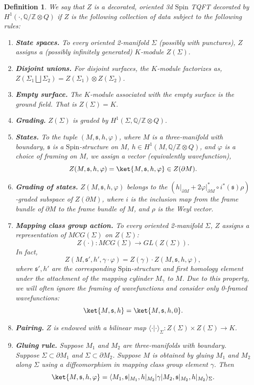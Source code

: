 \documentclass{article}
\newcommand{\Z}{{\mathbb Z}}
\newcommand{\Q}{{\mathbb Q}}
\newtheorem{definition}{Definition}
\numberwithin{corollary}{theorem}
\numberwithin{corollary}{proposition}
\begin{document}
\begin{definition} We say that $Z$ is a decorated, oriented 3d $\mathrm{Spin}$ TQFT decorated by $H^{1}(\cdot,\Q/\Z\otimes Q)$ if $Z$ is the following collection of data subject to the following rules: 
\begin{enumerate}
    \item \textbf{State spaces.} To every oriented 2-manifold $\Sigma$ (possibly with punctures), $Z$ assigns a (possibly infinitely generated) $K$-module $Z(\Sigma)$.
    \item \textbf{Disjoint unions.} For disjoint surfaces, the $K$-module factorizes as, $Z(\Sigma_1 \bigsqcup \Sigma_2) = Z(\Sigma_1) \otimes Z(\Sigma_2)$.
    \item \textbf{Empty surface.} The $K$-module associated with the empty surface is the ground field. That is $Z(\Sigma) = K$.
    \item \textbf{Grading.} $Z(\Sigma)$ is graded by $H^{1}(\Sigma, \Q/\Z\otimes Q)$.
    \item \textbf{States.} To the tuple $(M,\mathfrak{s},h, \varphi)$, where $M$ is a three-manifold with boundary, $\mathfrak{s}$ is a $\mathrm{Spin}$-structure on $M$, $h \in H^{1}(M,\Q/\Z\otimes Q) $, and $\varphi$ is a choice of framing on $M$, we assign a vector (equivalently wavefunction), $$Z(M,\mathfrak{s},h, \varphi) = \ket{M,\mathfrak{s},h, \varphi} \in Z(\partial M).$$
    \item \textbf{Grading of states.} $Z(M,\mathfrak{s},h, \varphi)$ belongs to the $(h\vert_{\partial M} + 2 \varphi\vert_{\partial M}^{*}\circ i^{*}(\mathfrak{s})  \rho )$-graded subspace of $Z(\partial M)$, where $i$ is the inclusion map from the frame bundle of $\partial M$ to the frame bundle of $M$, and $\rho$ is the Weyl vector.
    \item \textbf{Mapping class group action.} To every oriented 2-manifold $\Sigma$, $Z$ assigns a representation of $MCG(\Sigma)$ on $Z(\Sigma)$: $$Z(\cdot):MCG(\Sigma) \rightarrow GL(Z(\Sigma)).$$ In fact, $$Z(M,\mathfrak{s}',h', \gamma \cdot \varphi) = Z(\gamma) \cdot Z(M,\mathfrak{s},h, \varphi), $$ 
    where $\mathfrak{s}', h'$ are the corresponding $\mathrm{Spin}$-structure and first homology element under the attachment of the mapping cylinder $M_\gamma$ to $M$. Due to this property, we will often ignore the framing of wavefunctions and consider only 0-framed wavefunctions:
    $$\ket{M,\mathfrak{s},h} = \ket{M,\mathfrak{s},h,0}.$$
    \item \textbf{Pairing.} $Z$ is endowed with a bilinear map $\langle \cdot |\cdot \rangle_\Sigma: Z(\Sigma)\times Z(\Sigma) \rightarrow K$. 
    \item \textbf{Gluing rule.} Suppose $M_{1}$ and $M_{2}$ are three-manifolds with boundary. Suppose $\Sigma \subset \partial M_{1}$ and $\Sigma \subset \partial M_{2}$. Suppose $M$ is obtained by gluing $M_{1}$ and $M_{2}$ along $\Sigma$ using a diffeomorphism in mapping class group element $\gamma$. Then 
$$\ket{M, \mathfrak{s}, h, \varphi} = \langle M_{1}, \mathfrak{s}\vert_{M_1}, h\vert_{M_2}|  \gamma | M_{2}, \mathfrak{s}\vert_{M_2}, h\vert_{M_2}\rangle_\Sigma.$$
\end{enumerate}
\end{definition}
\end{document}

